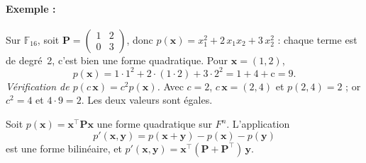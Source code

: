 \paragraph{Exemple :} Sur $\mathbb{F}_{16}$, soit $\mathbf{P}=\begin{pmatrix}1&2\\0&3\end{pmatrix}$, donc $p(\mathbf{x})=x_1^2+2\,x_1x_2+3\,x_2^2$ : chaque terme est de degré~2, c'est bien une forme quadratique. Pour $\mathbf{x}=(1,2)$,
\[p(\mathbf{x})=1\cdot1^2+2\cdot(1\cdot2)+3\cdot2^2=1+4+\mathrm{c}=9.\]
\emph{Vérification de $p(c\,\mathbf{x})=c^2p(\mathbf{x})$.} Avec $c=2$, $c\,\mathbf{x}=(2,4)$ et $p(2,4)=2$ ; or $c^2=4$ et $4\cdot9=2$. Les deux valeurs sont égales.

\begin{proposition}
Soit $p(\mathbf{x})=\mathbf{x}^{\top}\mathbf{P}\mathbf{x}$ une forme quadratique sur $F^n$. L'application
\[p'(\mathbf{x},\mathbf{y})=p(\mathbf{x}+\mathbf{y})-p(\mathbf{x})-p(\mathbf{y})\]
est une forme bilinéaire, et $p'(\mathbf{x},\mathbf{y})=\mathbf{x}^{\top}(\mathbf{P}+\mathbf{P}^{\top})\,\mathbf{y}$.
\end{proposition}
